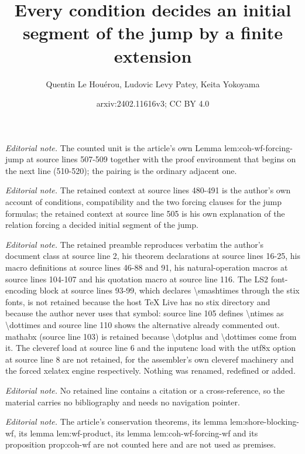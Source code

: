 \documentclass{article}
\title{Every condition decides an initial segment of the jump by a finite extension}
\author{Quentin Le Houérou, Ludovic Levy Patey, Keita Yokoyama}
\date{arxiv:2402.11616v3; CC BY 4.0}
\numberwithin{theorem}{section}
\begin{document}
\maketitle
\noindent\textit{Editorial note.} The counted unit is the article's own Lemma lem:coh-wf-forcing-jump at source lines 507-509 together with the proof environment that begins on the next line (510-520); the pairing is the ordinary adjacent one.\par\medskip
\noindent\textit{Editorial note.} The retained context at source lines 480-491 is the author's own account of conditions, compatibility and the two forcing clauses for the jump formulas; the retained context at source line 505 is his own explanation of the relation forcing a decided initial segment of the jump.\par\medskip
\noindent\textit{Editorial note.} The retained preamble reproduces verbatim the author's document class at source line 2, his theorem declarations at source lines 16-25, his macro definitions at source lines 46-88 and 91, his natural-operation macros at source lines 104-107 and his quotation macro at source line 116. The LS2 font-encoding block at source lines 93-99, which declares \textbackslash{}smashtimes through the stix fonts, is not retained because the host TeX Live has no stix directory and because the author never uses that symbol: source line 105 defines \textbackslash{}ntimes as \textbackslash{}dottimes and source line 110 shows the alternative already commented out. mathabx (source line 103) is retained because \textbackslash{}dotplus and \textbackslash{}dottimes come from it. The cleveref load at source line 6 and the inputenc load with the utf8x option at source line 8 are not retained, for the assembler's own cleveref machinery and the forced xelatex engine respectively. Nothing was renamed, redefined or added.\par\medskip
\noindent\textit{Editorial note.} No retained line contains a citation or a cross-reference, so the material carries no bibliography and needs no navigation pointer.\par\medskip
\noindent\textit{Editorial note.} The article's conservation theorems, its lemma lem:shore-blocking-wf, its lemma lem:wf-product, its lemma lem:coh-wf-forcing-wf and its proposition prop:coh-wf are not counted here and are not used as premises.\par\medskip
\end{document}
